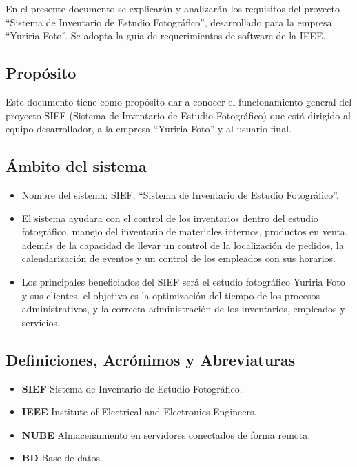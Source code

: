 En el presente documento se explicarán y analizarán los requisitos del proyecto “Sistema de Inventario de Estudio Fotográfico”, desarrollado para la empresa “Yuriria Foto”. Se adopta la guía de requerimientos de software de la IEEE.

\subsection{Propósito}

Este documento tiene como propósito dar a conocer el funcionamiento general del proyecto SIEF (Sistema de Inventario de Estudio Fotográfico) que está dirigido al equipo desarrollador, a la empresa “Yuriria Foto” y al usuario final.

\subsection{Ámbito del sistema}

\begin{itemize}
\item Nombre del sistema: SIEF, “Sistema de Inventario de Estudio Fotográfico”.
\item El sistema ayudara con el control de los inventarios dentro del estudio fotográfico, manejo del inventario de materiales internos, productos en venta, además de la capacidad de llevar un control de la localización de pedidos, la calendarización de eventos y un control de los empleados con sus horarios.
\item Los principales beneficiados del SIEF será el estudio fotográfico Yuriria Foto y sus clientes, el objetivo es la optimización del tiempo de los procesos administrativos, y la correcta administración de los inventarios, empleados y servicios.
\end{itemize}

\subsection{Definiciones, Acrónimos y Abreviaturas}

\begin{itemize}
\item \textbf{SIEF} Sistema de Inventario de Estudio Fotográfico.
\item \textbf{IEEE} Institute of Electrical and Electronics Engineers.
\item \textbf{NUBE} Almacenamiento en servidores conectados de forma remota.
\item \textbf{BD} Base de datos.
\end{itemize}

